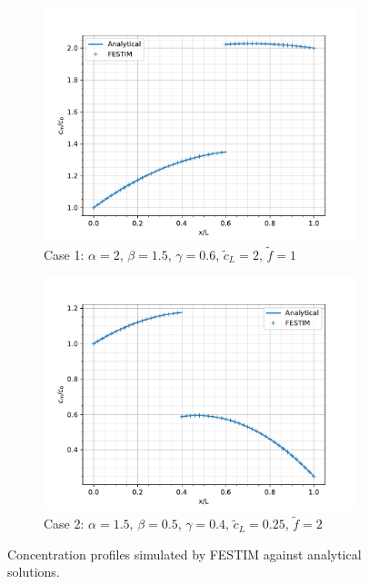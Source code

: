 \begin{figure} [h]
    \centering
    \begin{subfigure}{0.5\linewidth}
        \centering
        \includegraphics[width=\linewidth]{Figures/Chapter3/monoblocks/interface_condition/out_MES_case1.pdf}
        \caption{Case 1: $\alpha = 2$, $\beta = 1.5$, $\gamma=0.6$, $\tilde{c}_L = 2$, $\tilde{f}=1$}
    \end{subfigure}%
    \begin{subfigure}{0.5\linewidth}
        \centering
        \includegraphics[width=\linewidth]{Figures/Chapter3/monoblocks/interface_condition/out_MES_case2.pdf}
        \caption{Case 2:  $\alpha = 1.5$, $\beta = 0.5$, $\gamma=0.4$, $\tilde{c}_L = 0.25$, $\tilde{f}=2$}
    \end{subfigure}
    \caption{Concentration profiles simulated by FESTIM against analytical solutions.}
    \label{fig:comparison MES}
\end{figure}

